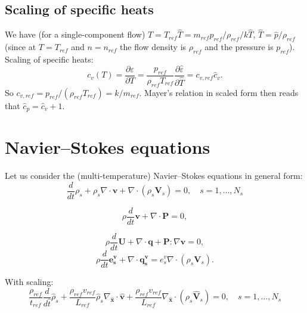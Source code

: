 \documentclass[a4paper,11pt,english]{article}
\begin{document}
\subsection{Scaling of specific heats}
We have (for a single-component flow) $T=T_{ref} \hat{T} = m_{ref} p_{ref} / \rho_{ref} / k \hat{T}$, $\hat{T} = \hat{p}/\rho_{ref}$ (since at $T=T_{ref}$ and $n=n_{ref}$ the flow density is $\rho_{ref}$ and the pressure is $p_{ref}$).
Scaling of specific heats:
\begin{equation}
    c_v(T) = \frac{\partial \varepsilon}{\partial T} = \frac{p_{ref}}{\rho_{ref}T_{ref}}\frac{\partial \hat{\varepsilon}}{\partial \hat{T}}=c_{v,ref} \hat{c}_{v}.
\end{equation}
So $c_{v,ref}=p_{ref} / (\rho_{ref}T_{ref}) = k / m_{ref}$. Mayer's relation in scaled form then reads that $\hat{c}_p = \hat{c}_v + 1$.

\section{Navier--Stokes equations}
Let us consider the (multi-temperature) Navier--Stokes equations in general form:
\begin{equation}
     \frac{d}{dt}\rho_s + \rho_s \nabla \cdot \mathbf{v} + \nabla \cdot (\rho_s \mathbf{V}_s) = 0,\quad s=1,\ldots,N_s
\end{equation}

\begin{equation}
     \rho \frac{d}{dt}\mathbf{v} + \nabla \cdot \mathbf{P} = 0,
\end{equation}

\begin{equation}
     \rho \frac{d}{dt}\mathbf{U} + \nabla \cdot \mathbf{q} + \mathbf{P} : \nabla \mathbf{v} = 0,
\end{equation}
\begin{equation}
     \rho \frac{d}{dt}\mathbf{e^v_s} + \nabla \cdot \mathbf{q^v_s} = e^v_s \nabla \cdot (\rho_s \mathbf{V}_s).
\end{equation}

With scaling:
\begin{equation}
    \frac{\rho_{ref}}{t_{ref}} \frac{d}{d\hat{t}}\hat{\rho}_s + \frac{\rho_{ref} v_{ref}}{L_{ref}} \hat{\rho}_s \nabla_{\hat{\mathbf{x}}} \cdot \hat{\mathbf{v}} + \frac{\rho_{ref}v_{ref}}{L_{ref}}\nabla_{\hat{\mathbf{x}}} \cdot (\rho_s \hat{\mathbf{V}}_s) = 0,\quad s=1,\ldots,N_s
\end{equation}
\end{document}
